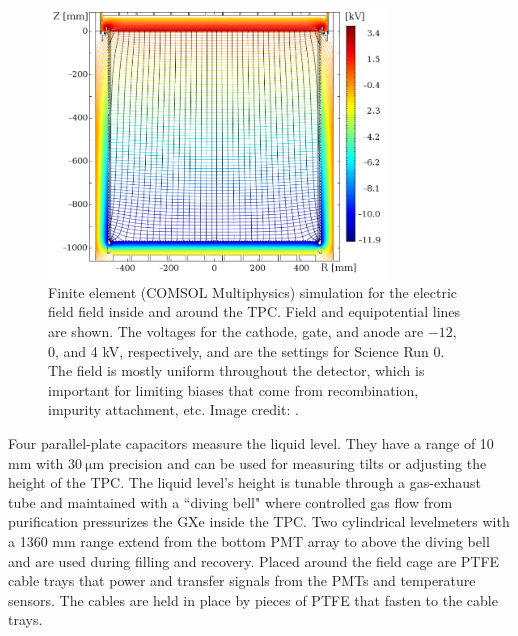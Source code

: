 \egroup

\begin{figure}
\centering
\includegraphics[width=0.8\textwidth]{ElectricField}
\caption[Finite element (COMSOL Multiphysics) simulation for the electric field field inside and around the TPC.  Field and equipotential
lines are
shown.]{Finite element (COMSOL Multiphysics) simulation for the electric field field inside and around the TPC.  Field and equipotential
lines are
shown.  The voltages for the cathode, gate, and anode are $-12$, 0, and 4 kV, respectively, and are the settings for Science Run 0.  The
field is mostly uniform throughout the detector, which is important for limiting biases that come from recombination, impurity attachment,
etc.  Image credit: .}
\label{fig:xenon1t_tpc_efield}
\end{figure}

Four parallel-plate capacitors measure the liquid level.  They have a range of 10 mm with $30\ \mathrm{\mu m}$ precision and can be used
for measuring tilts or adjusting the height of the TPC.  The liquid level's height is tunable through a gas-exhaust tube and maintained
with a ``diving bell" where controlled gas flow from purification pressurizes the GXe inside the TPC.  Two cylindrical levelmeters
with a 1360 mm range extend from the bottom PMT array to above the diving bell and are used during filling and recovery.  Placed around
the field cage are PTFE cable trays that power and transfer signals from the PMTs and temperature sensors.  The
cables are held in place by pieces of PTFE that fasten to the cable trays.



